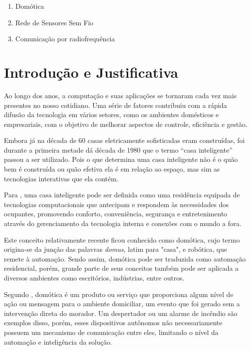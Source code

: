 \documentclass[
    12pt,               %
    a4paper,            %
    english,            %
    brazil,             %
    ]{article}
\begin{document}
        \begin{enumerate}
            \item Domótica
			\item Rede de Sensores Sem Fio
			\item Comunicação por radiofrequência
        \end{enumerate}


\section{Introdução e Justificativa}
Ao longo dos anos, a computação e suas aplicações se tornaram cada vez mais presentes no nosso cotidiano. Uma série de fatores
contribuiu com a rápida difusão da tecnologia em vários setores, como os ambientes domésticos e empresariais, com o objetivo de
melhorar aspectos de controle, eficiência e gestão.

Embora já na década de 60 casas eletricamente sofisticadas eram construídas, foi durante a primeira metade dá década de 1980 que o
termo  ``casa inteligente'' passou a ser utilizado. Pois o que determina uma casa inteligente não é o quão bem é construída ou
quão efetiva ela é em relação ao espaço, mas sim as tecnologias interativas que ela contém. \cite{harper2003}

Para , uma casa inteligente pode ser definida como uma residência equipada de tecnologias computacionais
que antecipam e respondem às necessidades dos ocupantes, promovendo conforto, conveniência, segurança e entretenimento através do
gerenciamento da tecnologia interna e conexões com o mundo a fora.

Este conceito relativamente recente ficou conhecido como domótica, cujo termo origina-se da junção das palavras \textit{domus},
latim para "casa", e robótica, que remete à automação. Sendo assim, domótica pode ser traduzida como automação residencial, porém,
grande parte de seus conceitos também pode ser aplicada a diversos ambientes como escritórios, indústrias, entre outros.

Segundo , domótica é um produto ou serviço que proporciona algum nível de ação ou mensagem para o ambiente
domiciliar, um evento que foi gerado sem a intervenção direta do morador. Um despertador ou um alarme de incêndio são exemplos
disso, porém, esses dispositivos autônomos não necessariamente possuem um mecanismo de comunicação entre eles, limitando o nível
da automação e inteligência da solução.
\end{document}
